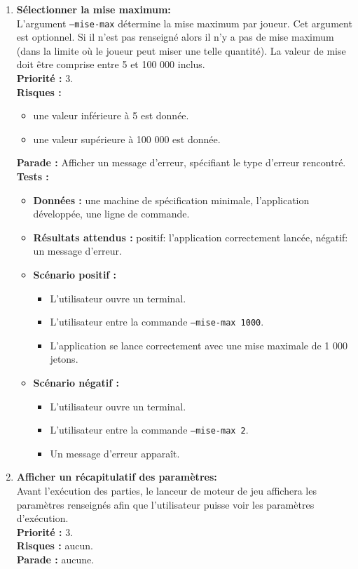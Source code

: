 \documentclass{article}
\newcommand{\code}[1]{\colorbox{light-gray}{\texttt{#1}}}
\begin{document}
\begin{enumerate}
    \item \textbf{Sélectionner la mise maximum:}\\
    L'argument \code{--mise-max} détermine la mise maximum par joueur. Cet argument est optionnel. Si il n'est pas renseigné alors il n'y a pas de mise maximum (dans la limite où le joueur peut miser une telle quantité). La valeur de mise doit être comprise entre 5 et 100 000 inclus. \\
    \textbf{Priorité :} 3. \\
    \textbf{Risques :}
    \begin{itemize}
        \item une valeur inférieure à 5 est donnée.
        \item une valeur supérieure à 100 000 est donnée.
    \end{itemize}
    \textbf{Parade :} Afficher un message d'erreur, spécifiant le type d'erreur rencontré.\\
    \textbf{Tests :}
    \begin{itemize}
        \item \textbf{Données :} une machine de spécification minimale, l'application développée, une ligne de commande.
        \item \textbf{Résultats attendus :} positif: l'application correctement lancée, négatif: un message d'erreur.
        \item \textbf{Scénario positif :}
        \begin{itemize}
            \item L’utilisateur ouvre un terminal.
            \item L’utilisateur entre la commande \code{--mise-max 1000}.
            \item L'application se lance correctement avec une mise maximale de 1 000 jetons.
        \end{itemize}
        \item \textbf{Scénario négatif :}
        \begin{itemize}
            \item L’utilisateur ouvre un terminal.
            \item L’utilisateur entre la commande \code{--mise-max 2}.
            \item Un message d'erreur apparaît.
        \end{itemize}
    \end{itemize}

    \item \textbf{Afficher un récapitulatif des paramètres:} \\
    Avant l'exécution des parties, le lanceur de moteur de jeu affichera les paramètres renseignés afin que l'utilisateur puisse voir les paramètres d'exécution. \\
    \textbf{Priorité :} 3. \\
    \textbf{Risques :} aucun. \\
    \textbf{Parade :} aucune.


\end{enumerate}
\end{document}
